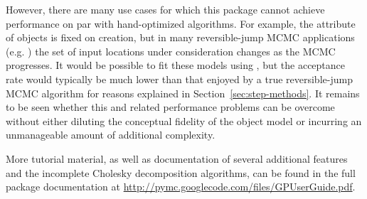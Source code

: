 \documentclass[article]{jss}
\begin{document}
However, there are many use cases for which this package cannot achieve performance on par with hand-optimized algorithms. For example, the  attribute of  objects is fixed on creation, but in many reversible-jump MCMC applications (e.g. \cite{gramacy}) the set of input locations under consideration changes as the MCMC progresses. It would be possible to fit these models using , but the acceptance rate would typically be much lower than that enjoyed by a true reversible-jump MCMC algorithm for reasons explained in Section~\ref{sec:step-methods}. It remains to be seen whether this and related performance problems can be overcome without either diluting the conceptual fidelity of the object model or incurring an unmanageable amount of additional complexity.

More tutorial material, as well as documentation of several additional features and the incomplete Cholesky decomposition algorithms, can be found in the full package documentation at \href{http://pymc.googlecode.com/files/GPUserGuide.pdf}{http://pymc.googlecode.com/files/GPUserGuide.pdf}.


\end{document}
